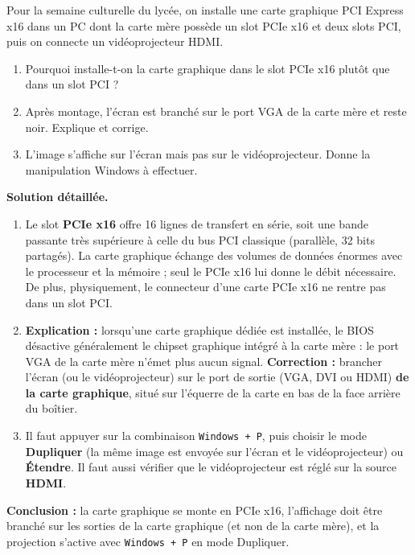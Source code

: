 \documentclass[11pt]{article}
\begin{document}
\begin{exoresolu}
Pour la semaine culturelle du lycée, on installe une carte graphique PCI Express x16 dans un PC dont la carte mère possède un slot PCIe x16 et deux slots PCI, puis on connecte un vidéoprojecteur HDMI.
\begin{enumerate}
\item Pourquoi installe-t-on la carte graphique dans le slot PCIe x16 plutôt que dans un slot PCI ?
\item Après montage, l'écran est branché sur le port VGA de la carte mère et reste noir. Explique et corrige.
\item L'image s'affiche sur l'écran mais pas sur le vidéoprojecteur. Donne la manipulation Windows à effectuer.
\end{enumerate}
\tcblower
\textbf{Solution détaillée.}
\begin{enumerate}
\item Le slot \textbf{PCIe x16} offre 16 lignes de transfert en série, soit une bande passante très supérieure à celle du bus PCI classique (parallèle, 32 bits partagés). La carte graphique échange des volumes de données énormes avec le processeur et la mémoire ; seul le PCIe x16 lui donne le débit nécessaire. De plus, physiquement, le connecteur d'une carte PCIe x16 ne rentre pas dans un slot PCI.
\item \textbf{Explication :} lorsqu'une carte graphique dédiée est installée, le BIOS désactive généralement le chipset graphique intégré à la carte mère : le port VGA de la carte mère n'émet plus aucun signal. \textbf{Correction :} brancher l'écran (ou le vidéoprojecteur) sur le port de sortie (VGA, DVI ou HDMI) \textbf{de la carte graphique}, situé sur l'équerre de la carte en bas de la face arrière du boîtier.
\item Il faut appuyer sur la combinaison \texttt{Windows + P}, puis choisir le mode \textbf{Dupliquer} (la même image est envoyée sur l'écran et le vidéoprojecteur) ou \textbf{Étendre}. Il faut aussi vérifier que le vidéoprojecteur est réglé sur la source \textbf{HDMI}.
\end{enumerate}
\textbf{Conclusion :} la carte graphique se monte en PCIe x16, l'affichage doit être branché sur les sorties de la carte graphique (et non de la carte mère), et la projection s'active avec \texttt{Windows + P} en mode Dupliquer.
\end{exoresolu}
\end{document}
